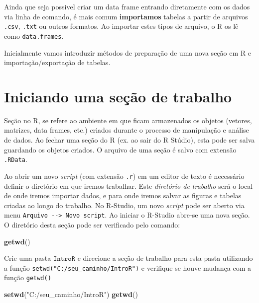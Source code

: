 \documentclass[
]{book}
\newenvironment{Shaded}{\begin{snugshade}}{\end{snugshade}}
\newcommand{\KeywordTok}[1]{\textcolor[rgb]{0.13,0.29,0.53}{\textbf{#1}}}
\newcommand{\NormalTok}[1]{#1}
\newcommand{\StringTok}[1]{\textcolor[rgb]{0.31,0.60,0.02}{#1}}
\begin{document}
Ainda que seja possivel criar um data frame entrando diretamente com os dados via linha de comando, é mais comum \textbf{importamos} tabelas a partir de arquivos \texttt{.csv}, \texttt{.txt} ou outros formatos. Ao importar estes tipos de arquivo, o R os lê como \texttt{data.frames}.

Inicialmente vamos introduzir métodos de preparação de uma nova seção em R e importação/exportação de tabelas.

\hypertarget{iniciando-uma-seuxe7uxe3o-de-trabalho}{%
\section{Iniciando uma seção de trabalho}\label{iniciando-uma-seuxe7uxe3o-de-trabalho}}

Seção no R, se refere ao ambiente em que ficam armazenados os objetos (vetores, matrizes, data frames, etc.) criados durante o processo de manipulação e análise de dados. Ao fechar uma seção do R (ex. ao sair do R Stúdio), esta pode ser salva guardando os objetos criados. O arquivo de uma seção é salvo com extensão \texttt{.RData}.

Ao abrir um novo \emph{script} (com extensão \texttt{.r}) em um editor de texto é necessário definir o diretório em que iremos trabalhar. Este \emph{diretório de trabalho} será o local de onde iremos importar dados, e para onde iremos salvar as figuras e tabelas criadas ao longo do trabalho. No R-Studio, um novo \emph{script} pode ser aberto via menu \texttt{Arquivo\ -\/-\textgreater{}\ Novo\ script}. Ao iniciar o R-Studio abre-se uma nova seção. O diretório desta seção pode ser verificado pelo comando:

\begin{Shaded}
\begin{Highlighting}[]
\KeywordTok{getwd}\NormalTok{()}
\end{Highlighting}
\end{Shaded}

Crie uma pasta \(\texttt{IntroR}\) e direcione a seção de trabalho para esta pasta utilizando a função \texttt{setwd("C:/seu\_caminho/IntroR")} e verifique se houve mudança com a função \texttt{getwd()}

\begin{Shaded}
\begin{Highlighting}[]
\KeywordTok{setwd}\NormalTok{(}\StringTok{"C:/seu_caminho/IntroR"}\NormalTok{)}
\KeywordTok{getwd}\NormalTok{()}
\end{Highlighting}
\end{Shaded}
\end{document}
